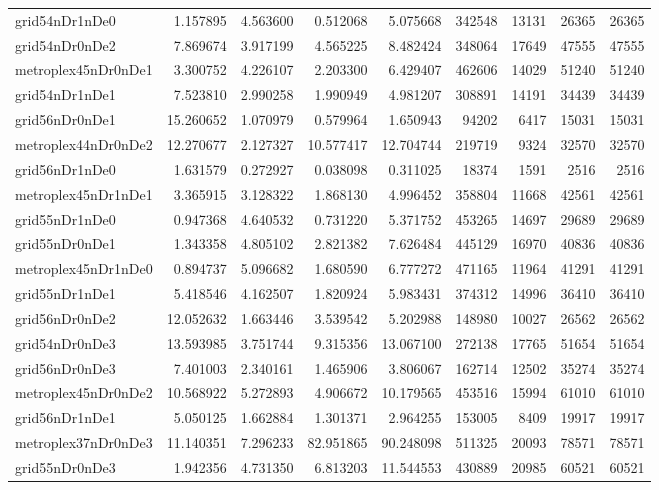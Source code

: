\begin{longtable}{|l|r|r|r|r|r|r|r|r|}
grid54nDr1nDe0 & 1.157895 & 4.563600 & 0.512068 & 5.075668 & 342548 & 13131 & 26365 & 26365 \\
grid54nDr0nDe2 & 7.869674 & 3.917199 & 4.565225 & 8.482424 & 348064 & 17649 & 47555 & 47555 \\
metroplex45nDr0nDe1 & 3.300752 & 4.226107 & 2.203300 & 6.429407 & 462606 & 14029 & 51240 & 51240 \\
grid54nDr1nDe1 & 7.523810 & 2.990258 & 1.990949 & 4.981207 & 308891 & 14191 & 34439 & 34439 \\
grid56nDr0nDe1 & 15.260652 & 1.070979 & 0.579964 & 1.650943 & 94202 & 6417 & 15031 & 15031 \\
metroplex44nDr0nDe2 & 12.270677 & 2.127327 & 10.577417 & 12.704744 & 219719 & 9324 & 32570 & 32570 \\
grid56nDr1nDe0 & 1.631579 & 0.272927 & 0.038098 & 0.311025 & 18374 & 1591 & 2516 & 2516 \\
metroplex45nDr1nDe1 & 3.365915 & 3.128322 & 1.868130 & 4.996452 & 358804 & 11668 & 42561 & 42561 \\
grid55nDr1nDe0 & 0.947368 & 4.640532 & 0.731220 & 5.371752 & 453265 & 14697 & 29689 & 29689 \\
grid55nDr0nDe1 & 1.343358 & 4.805102 & 2.821382 & 7.626484 & 445129 & 16970 & 40836 & 40836 \\
metroplex45nDr1nDe0 & 0.894737 & 5.096682 & 1.680590 & 6.777272 & 471165 & 11964 & 41291 & 41291 \\
grid55nDr1nDe1 & 5.418546 & 4.162507 & 1.820924 & 5.983431 & 374312 & 14996 & 36410 & 36410 \\
grid56nDr0nDe2 & 12.052632 & 1.663446 & 3.539542 & 5.202988 & 148980 & 10027 & 26562 & 26562 \\
grid54nDr0nDe3 & 13.593985 & 3.751744 & 9.315356 & 13.067100 & 272138 & 17765 & 51654 & 51654 \\
grid56nDr0nDe3 & 7.401003 & 2.340161 & 1.465906 & 3.806067 & 162714 & 12502 & 35274 & 35274 \\
metroplex45nDr0nDe2 & 10.568922 & 5.272893 & 4.906672 & 10.179565 & 453516 & 15994 & 61010 & 61010 \\
grid56nDr1nDe1 & 5.050125 & 1.662884 & 1.301371 & 2.964255 & 153005 & 8409 & 19917 & 19917 \\
metroplex37nDr0nDe3 & 11.140351 & 7.296233 & 82.951865 & 90.248098 & 511325 & 20093 & 78571 & 78571 \\
grid55nDr0nDe3 & 1.942356 & 4.731350 & 6.813203 & 11.544553 & 430889 & 20985 & 60521 & 60521 \\

\end{longtable}
